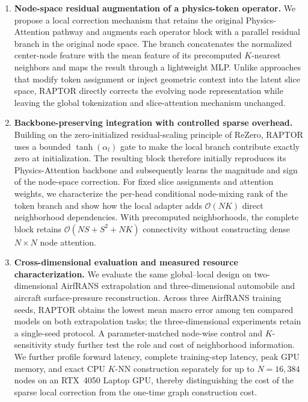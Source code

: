 \documentclass[a4paper,fleqn]{cas-sc}
\begin{document}
\begin{enumerate}
	\item \textbf{Node-space residual augmentation of a physics-token
		operator.}
	We propose a local correction mechanism that retains the original
	Physics-Attention pathway and augments each operator block with a
	parallel residual branch in the original node space. The branch
	concatenates the normalized center-node feature with the mean feature
	of its precomputed $K$-nearest neighbors and maps the result through a
	lightweight MLP. Unlike approaches that modify token assignment or
	inject geometric context into the latent slice space, RAPTOR directly
	corrects the evolving node representation while leaving the global
	tokenization and slice-attention mechanism unchanged.
	
	\item \textbf{Backbone-preserving integration with controlled sparse
		overhead.}
	Building on the zero-initialized residual-scaling principle of
	ReZero, RAPTOR uses a bounded $\tanh(\alpha_l)$ gate to make the local
	branch contribute exactly zero at initialization. The resulting block
	therefore initially reproduces its Physics-Attention backbone and
	subsequently learns the magnitude and sign of the node-space
	correction. For fixed slice assignments and attention weights, we
	characterize the per-head conditional node-mixing rank of the token
	branch and show how the local adapter adds $\mathcal O(NK)$ direct
	neighborhood dependencies. With precomputed neighborhoods, the
	complete block retains
	$\mathcal O(NS+S^2+NK)$ connectivity without constructing dense
	$N\times N$ node attention.
	
	\item \textbf{Cross-dimensional evaluation and measured resource
		characterization.}
	We evaluate the same global--local design on two-dimensional
	AirfRANS extrapolation and three-dimensional automobile and aircraft
	surface-pressure reconstruction. Across three AirfRANS training seeds,
	RAPTOR obtains the lowest mean macro error among ten compared models
	on both extrapolation tasks; the three-dimensional experiments retain
	a single-seed protocol. A parameter-matched node-wise control and
	$K$-sensitivity study further test the role and cost of neighborhood
	information.
	We further profile forward latency, complete training-step latency,
	peak GPU memory, and exact CPU $K$-NN construction separately for up
	to $N=16{,}384$ nodes on an RTX~4050 Laptop GPU, thereby distinguishing
	the cost of the sparse local correction from the one-time graph
	construction cost.
\end{enumerate}
\end{document}
